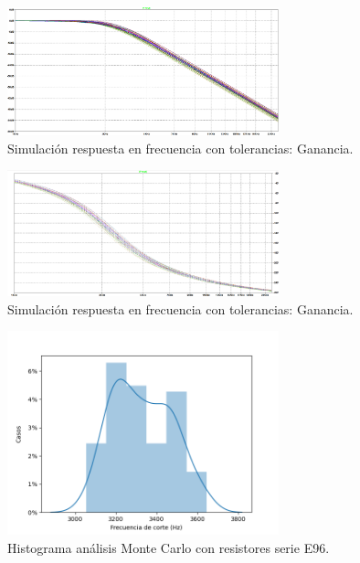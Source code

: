 \begin{figure}[H]
    \centering
    \includegraphics[width= 0.7\textwidth]{../Ejercicio2-DisenoDeCeldas/1CeldaSallenKey/images/simuMagNormalizados.png}
    \caption{Simulación respuesta en frecuencia con tolerancias: Ganancia.}
    \label{fig:simugain}
\end{figure}

\begin{figure}[H]
    \centering
    \includegraphics[width= 0.7\textwidth]{../Ejercicio2-DisenoDeCeldas/1CeldaSallenKey/images/simuFaseNormalizados.png}
    \caption{Simulación respuesta en frecuencia con tolerancias: Ganancia.}
    \label{fig:simuphase}
\end{figure}

\begin{figure}[H]
    \centering
    \includegraphics[width= 0.7\textwidth]{../Ejercicio2-DisenoDeCeldas/1CeldaSallenKey/images/MCSinPreset.png}
    \caption{Histograma análisis Monte Carlo con resistores serie E96.}
    \label{fig:MCE96}
\end{figure}

